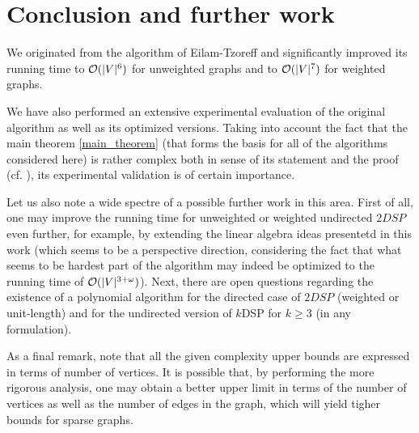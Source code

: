 \section{Conclusion and further work}

We originated from the algorithm of Eilam-Tzoreff and significantly improved its running time to $\mathcal{O}(|V|^6)$ for unweighted graphs and to $\mathcal{O}(|V|^7)$ for weighted graphs. 

We have also performed an extensive experimental evaluation of the original algorithm as well as its optimized versions. Taking into account the fact that the main theorem \ref{main_theorem} (that forms the basis for all of the algorithms considered here) is rather complex both in sense of its statement and the proof (cf. \cite{ET}), its experimental validation is of certain importance.

Let us also note a wide spectre of a possible further work in this area. First of all, one may improve the running time for unweighted or weighted undirected $2DSP$ even further, for example, by extending the linear algebra ideas presentetd  in this work (which seems to be a perspective direction, considering the fact that what seems to be hardest part of the algorithm may indeed be optimized to the running time of $\mathcal{O}(|V|^{3 + \omega})$). Next, there are open questions regarding the existence of a polynomial algorithm for the directed case of $2DSP$ (weighted or unit-length) and for the undirected version of $k$DSP for $k \geq 3$ (in any formulation). 

As a final remark, note that all the given complexity upper bounds are expressed in terms of number of vertices. It is possible that, by performing the more rigorous analysis, one may obtain a better upper limit in terms of the number of vertices as well as the number of edges in the graph, which will yield tigher bounds for sparse graphs. 
